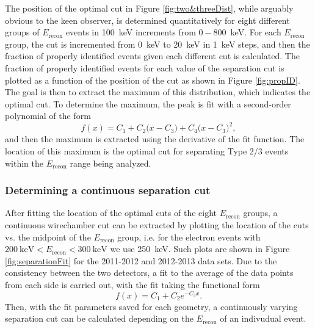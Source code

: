 The position of the optimal cut in Figure \ref{fig:two&threeDist}, while arguably obvious
to the keen observer, is determined quantitatively for eight different groups of $E_{\mathrm{recon}}$ events in
100~keV increments from $0-800$~keV. For each $E_{\mathrm{recon}}$ group,
the cut is incremented from 0~keV to 20~keV in 1~keV steps, and then the fraction
of properly identified events given each different cut is calculated. The fraction of properly identified events for
each value of the separation cut is plotted as a function of the position of the cut as shown
in Figure \ref{fig:propID}. The goal is then to extract the maximum of this distribution, which
indicates the optimal cut. To determine the maximum, the peak is fit with a second-order polynomial
of the form
%
\begin{equation}
  f(x) = C_1 + C_2\big(x-C_3\big) + C_4\big(x-C_3\big)^2,
\end{equation}
%
and then the maximum is extracted using the derivative of the fit function. The location
of this maximum is the optimal cut for separating Type 2/3 events within the $E_{\mathrm{recon}}$  
range being analyzed.



\subsubsection{Determining a continuous separation cut}

After fitting the location of the optimal cuts of the eight $E_{\mathrm{recon}}$ groups, a
continuous wirechamber cut can be extracted by plotting the location of the cuts vs. the
midpoint of the $E_{\mathrm{recon}}$ group, i.e. for the electron events with
$200\mathrm{~keV}<E_{\mathrm{recon}}<300\mathrm{~keV}$ we use 250~keV. Such plots are shown in
Figure \ref{fig:separationFit} for the 2011-2012
and 2012-2013 data sets. Due to the consistency between the two detectors, a fit to the
average of the data points from each side is carried out, with the fit taking the
functional form 
%
\begin{equation}
  f(x) = C_1 + C_2e^{-C_3x}.
\end{equation}
Then, with the fit parameters saved for each geometry, a continuously varying separation
cut can be calculated depending on the $E_{\mathrm{recon}}$ of an indivudual event.

